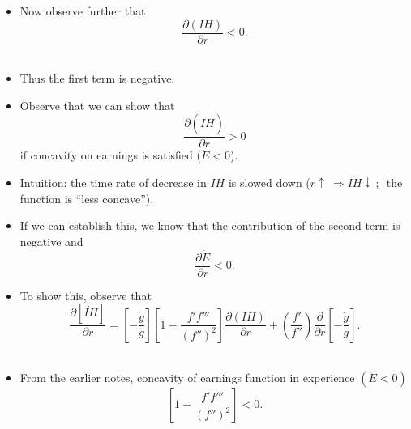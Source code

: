\documentclass[12pt,compress,handout]{beamer}  %
\begin{document}
\begin{frame}

\begin{itemize}
\item
Now observe further that
\begin{equation*}
\frac{\partial (IH)}{\partial r}<0\text{.}
\end{equation*}\ \\[3mm]

\item
Thus the first term is negative.\\[5mm]

\item
Observe that we can show that
\begin{equation*}
\frac{\partial (\dot{IH})}{\partial r}>0
\end{equation*}
if concavity on earnings is satisfied ($\ddot{E}<0$).
\end{itemize}
\end{frame}


\begin{frame}

\begin{itemize}
\item
Intuition: the time rate of decrease in $IH$ is slowed down ($r
\uparrow \
\Rightarrow IH \downarrow$\,;\ \,the function is ``less concave'').\\[12mm]

\item
If we can establish this, we know that the contribution of the
second term is negative and
\begin{equation*}
\frac{\partial \dot{E}}{\partial r}<0\text{.}
\end{equation*}
\end{itemize}

\end{frame}


\begin{frame}

\begin{itemize}
\item
To show this, observe that
\begin{equation*}
\frac{\partial [\dot{IH}]}{\partial r}=\left[
-\frac{\dot{g}}{g}\right] \left[ 1-\frac{f'f'''}{(f'')^2}\right]
\frac{\partial (IH)}{\partial r}+\left( \frac{f'}{f''}\right)
\frac{\partial }{\partial r}\left[ -\frac{\dot{g}}{g}\right]
\text{.}
\end{equation*}\ \\[7mm]

\item
From the earlier notes, concavity of earnings function in experience $(\ddot{E}<0)$
\begin{equation*}
\left[ 1-\frac{f'f'''}{(f'')^2}\right] <0\text{.}
\end{equation*}
\end{itemize}
\end{frame}
\end{document}

